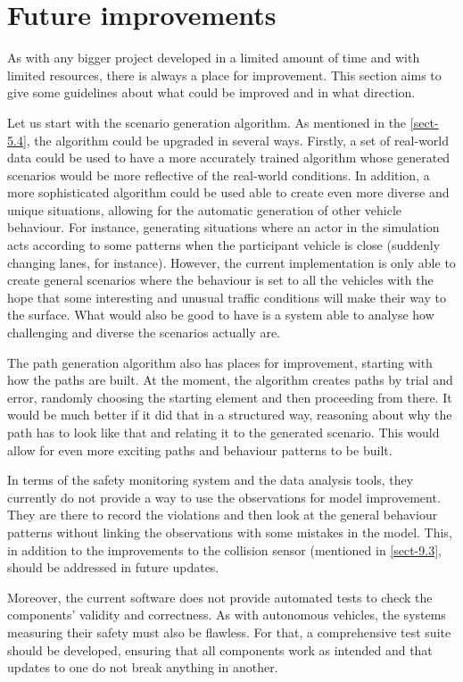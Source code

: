 \section{Future improvements} \label{sect-10.2}
As with any bigger project developed in a limited amount of time and with limited resources, there is always a place for improvement. This section aims to give some guidelines about what could be improved and in what direction.

Let us start with the scenario generation algorithm. As mentioned in the \autoref{sect-5.4}, the algorithm could be upgraded in several ways. Firstly, a set of real-world data could be used to have a more accurately trained algorithm whose generated scenarios would be more reflective of the real-world conditions. In addition, a more sophisticated algorithm could be used able to create even more diverse and unique situations, allowing for the automatic generation of other vehicle behaviour. For instance, generating situations where an actor in the simulation acts according to some patterns when the participant vehicle is close (suddenly changing lanes, for instance). However, the current implementation is only able to create general scenarios where the behaviour is set to all the vehicles with the hope that some interesting and unusual traffic conditions will make their way to the surface. What would also be good to have is a system able to analyse how challenging and diverse the scenarios actually are.

The path generation algorithm also has places for improvement, starting with how the paths are built. At the moment, the algorithm creates paths by trial and error, randomly choosing the starting element and then proceeding from there. It would be much better if it did that in a structured way, reasoning about why the path has to look like that and relating it to the generated scenario. This would allow for even more exciting paths and behaviour patterns to be built.

In terms of the safety monitoring system and the data analysis tools, they currently do not provide a way to use the observations for model improvement. They are there to record the violations and then look at the general behaviour patterns without linking the observations with some mistakes in the model. This, in addition to the improvements to the collision sensor (mentioned in \autoref{sect-9.3}, should be addressed in future updates.

Moreover, the current software does not provide automated tests to check the components' validity and correctness. As with autonomous vehicles, the systems measuring their safety must also be flawless. For that, a comprehensive test suite should be developed, ensuring that all components work as intended and that updates to one do not break anything in another.

